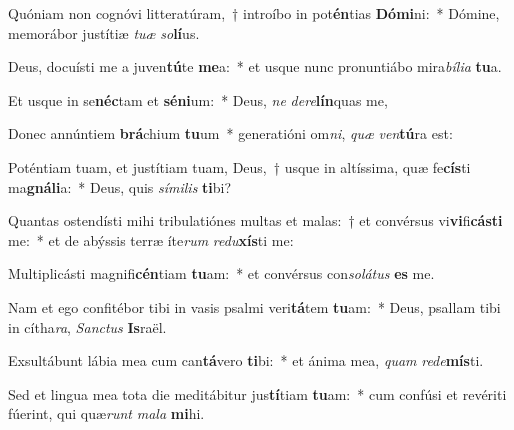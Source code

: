 \item Quóniam non cognóvi litteratúram,~† introíbo in pot\textbf{én}tias \textbf{Dó}\textbf{mi}ni:~* Dómine, memorábor justítiæ \textit{tu}\textit{æ} \textit{so}\textbf{lí}us.
\item Deus, docuísti me a juven\textbf{tú}te \textbf{me}a:~* et usque nunc pronuntiábo mira\textit{bí}\textit{li}\textit{a} \textbf{tu}a.
\item Et usque in se\textbf{néc}tam et \textbf{sé}\textbf{ni}um:~* Deus, \textit{ne} \textit{de}\textit{re}\textbf{lín}quas me,
\item Donec annúntiem \textbf{brá}chium \textbf{tu}um~* generatióni om\textit{ni}, \textit{quæ} \textit{ven}\textbf{tú}ra est:
\item Poténtiam tuam, et justítiam tuam, Deus,~† usque in altíssima, quæ fe\textbf{cís}ti ma\textbf{gná}\textbf{li}a:~* Deus, quis \textit{sí}\textit{mi}\textit{lis} \textbf{ti}bi?
\item Quantas ostendísti mihi tribulatiónes multas et malas:~† et convérsus vi\textbf{vi}fi\textbf{cás}\textbf{ti} me:~* et de abýssis terræ íte\textit{rum} \textit{re}\textit{du}\textbf{xís}ti me:
\item Multiplicásti magnifi\textbf{cén}tiam \textbf{tu}am:~* et convérsus con\textit{so}\textit{lá}\textit{tus} \textbf{es} me.
\item Nam et ego confitébor tibi in vasis psalmi veri\textbf{tá}tem \textbf{tu}am:~* Deus, psallam tibi in cítha\textit{ra}, \textit{Sanc}\textit{tus} \textbf{Is}raël.
\item Exsultábunt lábia mea cum can\textbf{tá}vero \textbf{ti}bi:~* et ánima mea, \textit{quam} \textit{red}\textit{e}\textbf{mís}ti.
\item Sed et lingua mea tota die meditábitur jus\textbf{tí}tiam \textbf{tu}am:~* cum confúsi et revériti fúerint, qui quæ\textit{runt} \textit{ma}\textit{la} \textbf{mi}hi.
